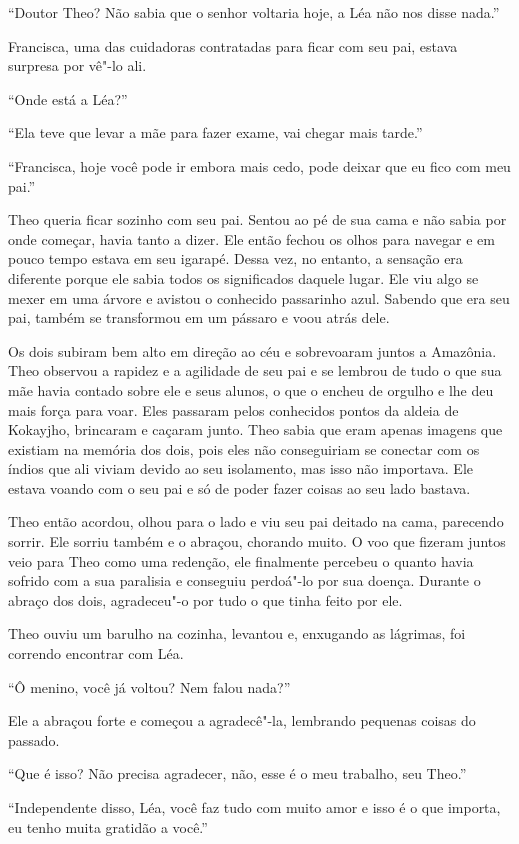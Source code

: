 ``Doutor Theo? Não sabia que o senhor voltaria hoje, a Léa não nos disse
nada.''

Francisca, uma das cuidadoras contratadas para ficar com seu pai, estava
surpresa por vê"-lo ali.

``Onde está a Léa?''

``Ela teve que levar a mãe para fazer exame, vai chegar mais tarde.''

``Francisca, hoje você pode ir embora mais cedo, pode deixar que eu fico
com meu pai.''

Theo queria ficar sozinho com seu pai. Sentou ao pé de sua cama e não
sabia por onde começar, havia tanto a dizer. Ele então fechou os olhos
para navegar e em pouco tempo estava em seu igarapé. Dessa vez, no
entanto, a sensação era diferente porque ele sabia todos os significados
daquele lugar. Ele viu algo se mexer em uma árvore e avistou o conhecido
passarinho azul. Sabendo que era seu pai, também se transformou em um
pássaro e voou atrás dele.

Os dois subiram bem alto em direção ao céu e sobrevoaram juntos a
Amazônia. Theo observou a rapidez e a agilidade de seu pai e se lembrou
de tudo o que sua mãe havia contado sobre ele e seus alunos, o que o
encheu de orgulho e lhe deu mais força para voar. Eles passaram pelos
conhecidos pontos da aldeia de Kokayjho, brincaram e caçaram junto. Theo
sabia que eram apenas imagens que existiam na memória dos dois, pois
eles não conseguiriam se conectar com os índios que ali viviam devido ao
seu isolamento, mas isso não importava. Ele estava voando com o seu pai
e só de poder fazer coisas ao seu lado bastava.

Theo então acordou, olhou para o lado e viu seu pai deitado na cama,
parecendo sorrir. Ele sorriu também e o abraçou, chorando muito. O voo
que fizeram juntos veio para Theo como uma redenção, ele finalmente
percebeu o quanto havia sofrido com a sua paralisia e conseguiu
perdoá"-lo por sua doença. Durante o abraço dos dois, agradeceu"-o por
tudo o que tinha feito por ele.

Theo ouviu um barulho na cozinha, levantou e, enxugando as lágrimas, foi
correndo encontrar com Léa.

``Ô menino, você já voltou? Nem falou nada?''

Ele a abraçou forte e começou a agradecê"-la, lembrando pequenas coisas
do passado.

``Que é isso? Não precisa agradecer, não, esse é o meu trabalho, seu
Theo.''

``Independente disso, Léa, você faz tudo com muito amor e isso é o que
importa, eu tenho muita gratidão a você.''

